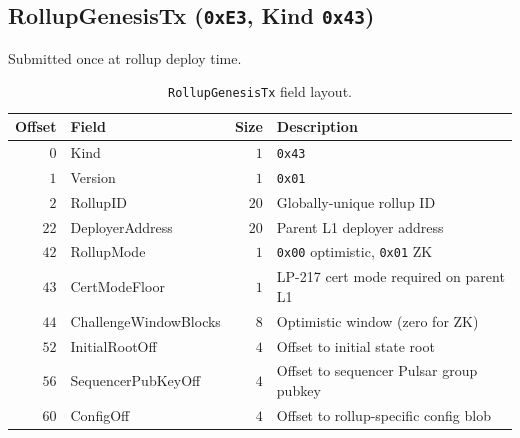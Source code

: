 \subsection{RollupGenesisTx (\texttt{0xE3}, Kind \texttt{0x43})}

Submitted once at rollup deploy time.

\begin{table}[h]
\centering
\small
\begin{tabular}{@{}rlrp{6cm}@{}}
\toprule
\textbf{Offset} & \textbf{Field} & \textbf{Size} & \textbf{Description} \\
\midrule
$0$ & Kind & $1$ & \texttt{0x43} \\
$1$ & Version & $1$ & \texttt{0x01} \\
$2$ & RollupID & $20$ & Globally-unique rollup ID \\
$22$ & DeployerAddress & $20$ & Parent L1 deployer address \\
$42$ & RollupMode & $1$ & \texttt{0x00} optimistic, \texttt{0x01} ZK \\
$43$ & CertModeFloor & $1$ & LP-217 cert mode required on parent L1 \\
$44$ & ChallengeWindowBlocks & $8$ & Optimistic window (zero for ZK) \\
$52$ & InitialRootOff & $4$ & Offset to initial state root \\
$56$ & SequencerPubKeyOff & $4$ & Offset to sequencer Pulsar group pubkey \\
$60$ & ConfigOff & $4$ & Offset to rollup-specific config blob \\
\bottomrule
\end{tabular}
\caption{\texttt{RollupGenesisTx} field layout.}
\label{tab:genesistx}
\end{table}

